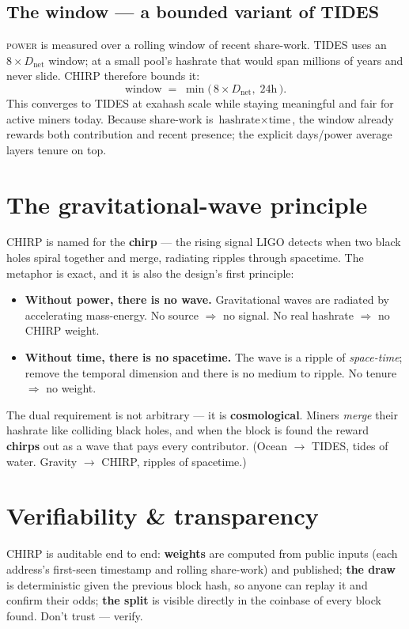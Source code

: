 \documentclass[11pt]{article}
\begin{document}
\subsection{The window --- a bounded variant of TIDES}
\textsc{power} is measured over a rolling window of recent share-work. TIDES uses an
$8 \times D_{\text{net}}$ window; at a small pool's hashrate that would span millions of years and
never slide. CHIRP therefore bounds it:
\[
  \text{window} \;=\; \min\!\big(\,8 \times D_{\text{net}},\; 24\text{h}\,\big).
\]
This converges to TIDES at exahash scale while staying meaningful and fair for active miners today.
Because share-work is $\text{hashrate} \times \text{time}$, the window already rewards both
contribution and recent presence; the explicit days/power average layers tenure on top.

\section{The gravitational-wave principle}
CHIRP is named for the \textbf{chirp} --- the rising signal LIGO detects when two black holes spiral
together and merge, radiating ripples through spacetime. The metaphor is exact, and it is also the
design's first principle:
\begin{itemize}[leftmargin=1.4em]
  \item \textbf{Without power, there is no wave.} Gravitational waves are radiated by accelerating
  mass-energy. No source $\Rightarrow$ no signal. No real hashrate $\Rightarrow$ no CHIRP weight.
  \item \textbf{Without time, there is no spacetime.} The wave is a ripple of \emph{space-time};
  remove the temporal dimension and there is no medium to ripple. No tenure $\Rightarrow$ no weight.
\end{itemize}
The dual requirement is not arbitrary --- it is \textbf{cosmological}. Miners \emph{merge} their
hashrate like colliding black holes, and when the block is found the reward \textbf{chirps} out as a
wave that pays every contributor. (Ocean $\to$ TIDES, tides of water. Gravity $\to$ CHIRP, ripples
of spacetime.)

\section{Verifiability \& transparency}
CHIRP is auditable end to end: \textbf{weights} are computed from public inputs (each address's
first-seen timestamp and rolling share-work) and published; \textbf{the draw} is deterministic given
the previous block hash, so anyone can replay it and confirm their odds; \textbf{the split} is
visible directly in the coinbase of every block found. Don't trust --- verify.
\end{document}
